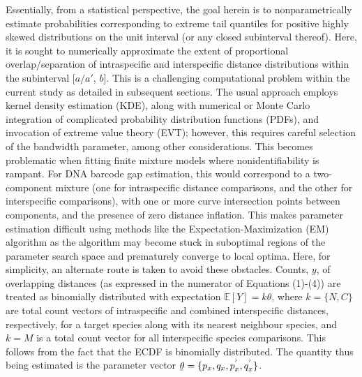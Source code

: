 \documentclass[12pt]{article}
\begin{document}
Essentially, from a statistical perspective, the goal herein is to nonparametrically estimate probabilities corresponding to extreme tail quantiles for positive highly skewed distributions on the unit interval  (or any closed subinterval thereof). Here, it is sought to numerically approximate the extent of proportional overlap/separation of intraspecific and interspecific distance distributions within the subinterval [$a/a'$, $b$]. This is a challenging computational problem within the current study as detailed in subsequent sections. The usual approach employs kernel density estimation (KDE), along with numerical or Monte Carlo integration of complicated probability distribution functions (PDFs), and invocation of extreme value theory (EVT); however, this requires careful selection of the bandwidth parameter, among other considerations. This becomes problematic when fitting finite mixture models where nonidentifiability is rampant. For DNA barcode gap estimation, this would correspond to a two-component mixture (one for intraspecific distance comparisons, and the other for interspecific comparisons), with one or more curve intersection points between components, and the presence of zero distance inflation. This makes parameter estimation difficult using methods like the Expectation-Maximization (EM) algorithm \citep{dempster1977maximum} as the algorithm may become stuck in suboptimal regions of the parameter search space and prematurely converge to local optima. Here, for simplicity, an alternate route is taken to avoid these obstacles. Counts, $y$, of overlapping distances (as expressed in the numerator of Equations (1)-(4)) are treated as binomially distributed with expectation $\mathbb{E}[Y] = k\theta$, where $k = \{N, C\}$ are total count vectors of intraspecific and combined interspecific distances, respectively, for a target species along with its nearest neighbour species, and $k = M$ is a total count vector for all interspecific species comparisons. This follows from the fact that the ECDF is binomially distributed. The quantity thus being estimated is the parameter vector $\underaccent{\bar}{\theta} = \{p_x, q_x, p^{'}_x, q^{'}_x\}$. 
\end{document}
